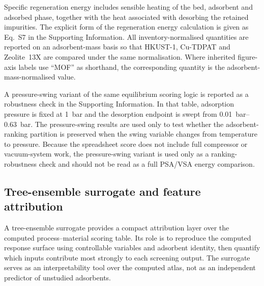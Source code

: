 \documentclass[11pt,a4paper]{article}
\begin{document}
Specific regeneration energy includes sensible heating of the bed,
adsorbent and adsorbed phase, together with the heat associated with
desorbing the retained impurities. The explicit form of the regeneration
energy calculation is given as Eq.~S7 in the Supporting Information. All
inventory-normalised quantities are reported on an adsorbent-mass basis so
that HKUST-1, Cu-TDPAT and Zeolite~13X are compared under the same
normalisation. Where inherited figure-axis labels use ``MOF'' as shorthand,
the corresponding quantity is the adsorbent-mass-normalised value.


A pressure-swing variant of the same equilibrium scoring logic is reported
as a robustness check in the Supporting Information. In that table, adsorption
pressure is fixed at \SI{1}{bar} and the desorption endpoint is swept from
\SIrange{0.01}{0.63}{bar}. The pressure-swing results are used only to test
whether the adsorbent-ranking partition is preserved when the swing variable
changes from temperature to pressure. Because the spreadsheet score does
not include full compressor or vacuum-system work, the pressure-swing variant
is used only as a ranking-robustness check and should not be read as a full
PSA/VSA energy comparison.

\subsection{Tree-ensemble surrogate and feature attribution}
\label{sec:surrogate}

A tree-ensemble surrogate provides a compact attribution layer over the
computed process--material scoring table. Its role is to reproduce the
computed response surface using controllable variables and adsorbent
identity, then quantify which inputs contribute most strongly to each
screening output. The surrogate serves as an interpretability tool over
the computed atlas, not as an independent predictor of unstudied
adsorbents.
\end{document}
